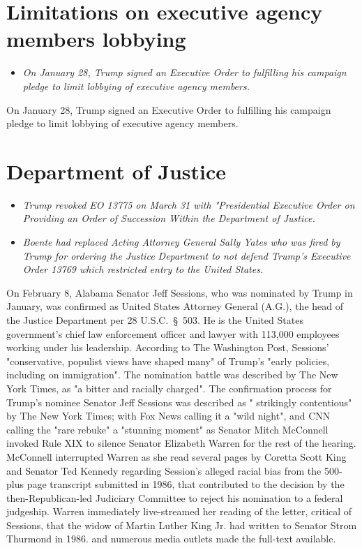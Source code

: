 \section{Limitations on executive agency members
lobbying}\label{limitations-on-executive-agency-members-lobbying}

\begin{itemize}
\item
  \emph{On January 28, Trump signed an Executive Order to fulfilling his
  campaign pledge to limit lobbying of executive agency members.}
\end{itemize}

On January 28, Trump signed an Executive Order to fulfilling his
campaign pledge to limit lobbying of executive agency members.

\section{Department of Justice}\label{department-of-justice}

\begin{itemize}
\item
  \emph{Trump revoked EO 13775 on March 31 with "Presidential Executive
  Order on Providing an Order of Succession Within the Department of
  Justice.}
\item
  \emph{Boente had replaced Acting Attorney General Sally Yates who was
  fired by Trump for ordering the Justice Department to not defend
  Trump's Executive Order 13769 which restricted entry to the United
  States.}
\end{itemize}

On February 8, Alabama Senator Jeff Sessions, who was nominated by Trump
in January, was confirmed as United States Attorney General (A.G.), the
head of the Justice Department per 28 U.S.C.~§~503. He is the United
States government's chief law enforcement officer and lawyer with
113,000 employees working under his leadership. According to The
Washington Post, Sessions' "conservative, populist views have shaped
many" of Trump's "early policies, including on immigration". The
nomination battle was described by The New York Times, as "a bitter and
racially charged". The confirmation process for Trump's nominee Senator
Jeff Sessions was described as " strikingly contentious" by The New York
Times; with Fox News calling it a "wild night", and CNN calling the
"rare rebuke" a "stunning moment" as Senator Mitch McConnell invoked
Rule XIX to silence Senator Elizabeth Warren for the rest of the
hearing. McConnell interrupted Warren as she read several pages by
Coretta Scott King and Senator Ted Kennedy regarding Session's alleged
racial bias from the 500-plus page transcript submitted in 1986, that
contributed to the decision by the then-Republican-led Judiciary
Committee to reject his nomination to a federal judgeship. Warren
immediately live-streamed her reading of the letter, critical of
Sessions, that the widow of Martin Luther King Jr. had written to
Senator Strom Thurmond in 1986. and numerous media outlets made the
full-text available.

